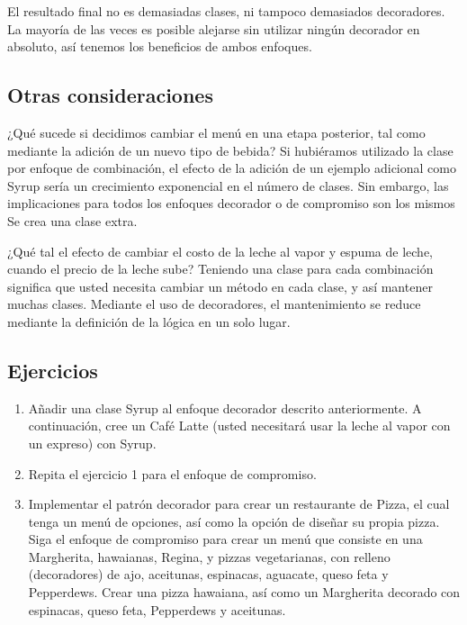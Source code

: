 El resultado final no es demasiadas clases, ni tampoco demasiados decoradores. La mayoría de las veces es posible alejarse sin utilizar ningún decorador en absoluto, así tenemos los beneficios de ambos enfoques.     \newline


\subsection*{Otras consideraciones}
\label{subsec:oc}


¿Qué sucede si decidimos cambiar el menú en una etapa posterior, tal como mediante la adición de un nuevo tipo de bebida? Si hubiéramos utilizado la clase por enfoque de combinación, el efecto de la adición de un ejemplo adicional como Syrup sería un crecimiento exponencial en el número de clases. Sin embargo, las implicaciones para todos los enfoques decorador o de compromiso son los mismos \- Se crea una clase extra.    \newline

¿Qué tal el efecto de cambiar el costo de la leche al vapor y espuma de leche, cuando el precio de la leche sube? Teniendo una clase para cada combinación significa que usted necesita cambiar un método en cada clase, y así mantener muchas clases. Mediante el uso de decoradores, el mantenimiento se reduce mediante la definición de la lógica en un solo lugar.  \newline

\subsection*{Ejercicios}
\label{subsec:ejer}

\begin{enumerate}[1.]
    \item Añadir una clase Syrup al enfoque decorador descrito anteriormente. A continuación, cree un Café Latte (usted necesitará usar la leche al vapor con un expreso) con Syrup.
    \item Repita el ejercicio 1 para el enfoque de compromiso.
    \item Implementar el patrón decorador para crear un restaurante de Pizza, el cual tenga un menú de opciones, así como la opción de diseñar su propia pizza. Siga el enfoque de compromiso para crear un menú que consiste en una Margherita, hawaianas, Regina, y pizzas vegetarianas, con relleno (decoradores) de ajo, aceitunas, espinacas, aguacate, queso feta y Pepperdews. Crear una pizza hawaiana, así como un Margherita decorado con espinacas, queso feta, Pepperdews y aceitunas.
\end{enumerate}

\newpage
